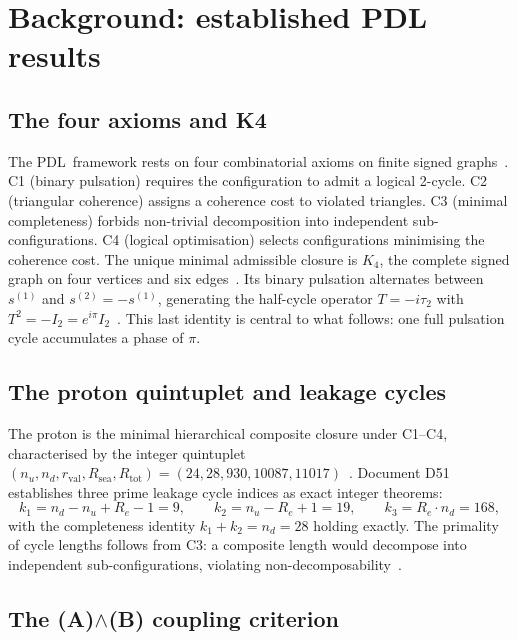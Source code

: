\documentclass[12pt,a4paper]{article}
\theoremstyle{plain}
\theoremstyle{definition}
\theoremstyle{remark}
\newcommand{\PDL}{\textsc{PDL}}
\newcommand{\Kfour}{K_4}
\newcommand{\Rtot}{R_{\mathrm{tot}}}
\newcommand{\Rsea}{R_{\mathrm{sea}}}
\newcommand{\rval}{r_{\mathrm{val}}}
\renewcommand{\Re}{R_e}
\renewcommand{\nu}{n_u}
\newcommand{\kone}{k_1}
\newcommand{\ktwo}{k_2}
\newcommand{\kthree}{k_3}
\begin{document}
\section{Background: established PDL results}
\label{sec:background}

\subsection{The four axioms and K4}

The \PDL\ framework rests on four combinatorial axioms on finite signed graphs~\cite{PDL_D01}. C1 (binary pulsation) requires the configuration to admit a logical 2-cycle. C2 (triangular coherence) assigns a coherence cost to violated triangles. C3 (minimal completeness) forbids non-trivial decomposition into independent sub-configurations. C4 (logical optimisation) selects configurations minimising the coherence cost. The unique minimal admissible closure is $\Kfour$, the complete signed graph on four vertices and six edges~\cite{PDL_D16a}. Its binary pulsation alternates between $s^{(1)}$ and $s^{(2)} = -s^{(1)}$, generating the half-cycle operator $T = -i\tau_2$ with $T^2 = -I_2 = e^{i\pi}I_2$~\cite{PDL_D33}. This last identity is central to what follows: one full pulsation cycle accumulates a phase of $\pi$.

\subsection{The proton quintuplet and leakage cycles}

The proton is the minimal hierarchical composite closure under C1--C4, characterised by the integer quintuplet $(n_u, n_d, \rval, \Rsea, \Rtot) = (24, 28, 930, 10087, 11017)$~\cite{PDL_D47}. Document D51~\cite{PDL_D51} establishes three prime leakage cycle indices as exact integer theorems:
\begin{equation}
\kone = n_d - \nu + \Re - 1 = 9, \qquad \ktwo = \nu - \Re + 1 = 19, \qquad \kthree = \Re\cdot n_d = 168,
\label{eq:kdef}
\end{equation}
with the completeness identity $\kone + \ktwo = n_d = 28$ holding exactly. The primality of cycle lengths follows from C3: a composite length would decompose into independent sub-configurations, violating non-decomposability~\cite{PDL_D51}.

\subsection{The (A)\texorpdfstring{$\wedge$}{hat}(B) coupling criterion}
\end{document}
